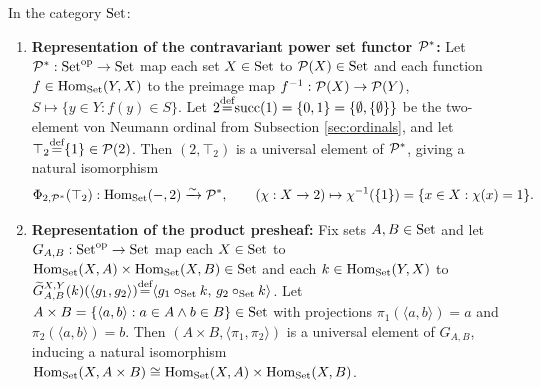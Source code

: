 \documentclass[10pt,a4paper]{article}
\begin{document}
\begin{theorem}\label{thm:set_reps}
In the category ${\textrm{Set}}$:
\begin{enumerate}
\item \textbf{Representation of the contravariant power set functor ${\mathcal{P}}^*$:} Let ${\mathcal{P}}^* : {\textrm{Set}}^{\textrm{op}} \to {\textrm{Set}}$ map each set $X \in {\textrm{Set}}$ to ${\mathcal{P}}(X) \in {\textrm{Set}}$ and each function $f \in {\textrm{Hom}}_{\textrm{Set}}(Y, X)$ to the preimage map $f^{-1} : {\mathcal{P}}(X) \to {\mathcal{P}}(Y)$, $S \mapsto \{y \in Y : f(y) \in S\}$. Let $2 {\stackrel{{\textrm{def}}}{=}} {\textrm{succ}}(1) = \{0, 1\} = \{\emptyset, \{\emptyset\}\}$ be the two-element von Neumann ordinal from Subsection \ref{sec:ordinals}, and let $\top_2 {\stackrel{{\textrm{def}}}{=}} \{1\} \in {\mathcal{P}}(2)$. Then $(2, \top_2)$ is a universal element of ${\mathcal{P}}^*$, giving a natural isomorphism
$$\Phi_{2,{\mathcal{P}}^*}(\top_2) : {\textrm{Hom}}_{\textrm{Set}}(-, 2) \xrightarrow{\sim} {\mathcal{P}}^*, \qquad (\chi : X \to 2) \mapsto \chi^{-1}(\{1\}) = \{x \in X : \chi(x) = 1\}.$$
\item \textbf{Representation of the product presheaf:} Fix sets $A, B \in {\textrm{Set}}$ and let $G_{A,B} : {\textrm{Set}}^{\textrm{op}} \to {\textrm{Set}}$ map each $X \in {\textrm{Set}}$ to ${\textrm{Hom}}_{\textrm{Set}}(X, A) \times {\textrm{Hom}}_{\textrm{Set}}(X, B) \in {\textrm{Set}}$ and each $k \in {\textrm{Hom}}_{\textrm{Set}}(Y, X)$ to $\widetilde{G}_{A,B}^{X,Y}(k)(\langle g_1, g_2 \rangle) {\stackrel{{\textrm{def}}}{=}} \langle g_1 \circ_{\textrm{Set}} k,\, g_2 \circ_{\textrm{Set}} k \rangle$. Let $A \times B = \{\langle a, b \rangle : a \in A \land b \in B\} \in {\textrm{Set}}$ with projections $\pi_1(\langle a,b \rangle) = a$ and $\pi_2(\langle a,b \rangle) = b$. Then $(A \times B, \langle \pi_1, \pi_2 \rangle)$ is a universal element of $G_{A,B}$, inducing a natural isomorphism ${\textrm{Hom}}_{\textrm{Set}}(X, A \times B) \cong {\textrm{Hom}}_{\textrm{Set}}(X, A) \times {\textrm{Hom}}_{\textrm{Set}}(X, B)$.
\end{enumerate}
\end{theorem}
\myprf
\end{document}
